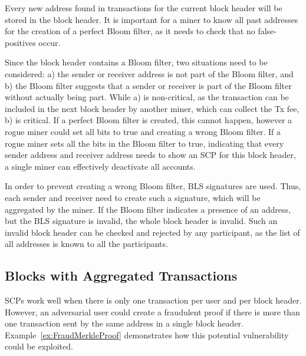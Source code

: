 \documentclass[conference]{IEEEtran}
\begin{document}
Every new address found in transactions for the current block header will be stored in the block header. It is important for a miner to know all past addresses for the creation of a perfect Bloom filter, as it needs to check that no false-positives occur.

Since the block header contains a Bloom filter, two situations need to be considered: a) the sender or receiver address is not part of the Bloom filter, and b) the Bloom filter suggests that a sender or receiver is part of the Bloom filter without actually being part. While a) is non-critical, as the transaction can be included in the next block header by another miner, which can collect the Tx fee, b) is critical. If a perfect Bloom filter is created, this cannot happen, however a rogue miner could set all bits to true and creating a wrong Bloom filter. If a rogue miner sets all the bits in the Bloom filter to true, indicating that every sender address and receiver address needs to show an SCP for this block header, a single miner can effectively deactivate all accounts.

In order to prevent creating a wrong Bloom filter, BLS signatures are used. Thus, each sender and receiver need to create such a signature, which will be aggregated by the miner. If the Bloom filter indicates a presence of an address, but the BLS signature is invalid, the whole block header is invalid. Such an invalid block header can be checked and rejected by any participant, as the list of all addresses is known to all the participants.

\subsection{Blocks with Aggregated Transactions}
SCPs work well when there is only one transaction per user and per block header. However, an adversarial user could create a fraudulent proof if there is more than one transaction sent by the same address in a single block header. Example~\ref{ex:FraudMerkleProof} demonstrates how this potential vulnerability could be exploited.
\end{document}
